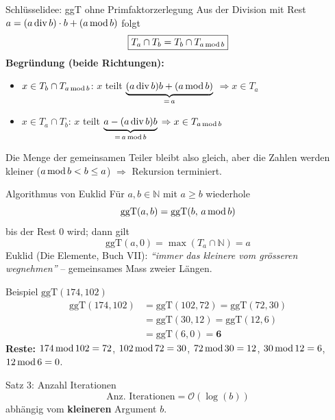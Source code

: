 \documentclass[a4paper, fontsize=7pt]{scrartcl}
\def\N{\mathbb{N}}  %
\def\oof{\mathcal{O}}
\newcommand{\Div}{\mskip3mu\mathrm{div}\mskip3mu}
\newcommand{\Mod}{\mskip3mu\mathrm{mod}\mskip3mu}
\begin{document}
\begin{mainbox}{Schlüsselidee: ggT ohne Primfaktorzerlegung}
Aus der Division mit Rest $a = (a \Div b)\cdot b + (a \Mod b)$ folgt
$$\boxed{T_a \cap T_b = T_b \cap T_{a \Mod b}}$$
\textbf{Begründung (beide Richtungen):}
\begin{itemize}
    \item $x \in T_b \cap T_{a \Mod b}$: $x$ teilt
          $\underbrace{(a \Div b)b + (a \Mod b)}_{=\,a}$
          $\Rightarrow x \in T_a$
    \item $x \in T_a \cap T_b$: $x$ teilt
          $\underbrace{a - (a \Div b)b}_{=\,a \Mod b}$
          $\Rightarrow x \in T_{a \Mod b}$
\end{itemize}
Die Menge der gemeinsamen Teiler bleibt also gleich, aber die Zahlen werden
kleiner ($a \Mod b < b \le a$) $\Rightarrow$ Rekursion terminiert.
\end{mainbox}

\begin{mainbox}{Algorithmus von Euklid}
Für $a,b \in \N$ mit $a \ge b$ wiederhole
$$\mathrm{ggT}(a,b) = \mathrm{ggT}(b,\, a \Mod b)$$
bis der Rest $0$ wird; dann gilt
$$\boxed{\mathrm{ggT}(a,0) = \max(T_a \cap \N) = a}$$
Euklid (Die Elemente, Buch VII): \emph{``immer das kleinere vom grösseren
wegnehmen''} -- gemeinsames Mass zweier Längen.
\end{mainbox}

\begin{subbox}{Beispiel $\mathrm{ggT}(174,102)$}
\begin{align*}
\mathrm{ggT}(174,102) &= \mathrm{ggT}(102,72) = \mathrm{ggT}(72,30)\\
 &= \mathrm{ggT}(30,12) = \mathrm{ggT}(12,6)\\
 &= \mathrm{ggT}(6,0) = \mathbf{6}
\end{align*}
\textbf{Reste:} $174 \Mod 102 = 72$, $102 \Mod 72 = 30$,
$72 \Mod 30 = 12$, $30 \Mod 12 = 6$, $12 \Mod 6 = 0$.
\end{subbox}

\begin{mainbox}{Satz 3: Anzahl Iterationen}
$$\boxed{\text{Anz.\ Iterationen} = \oof(\log(b))}$$
abhängig vom \textbf{kleineren} Argument $b$.
\end{mainbox}
\end{document}
